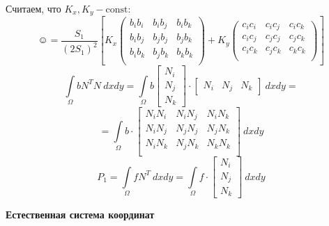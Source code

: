 \documentclass{bmstu}
\begin{document}
	
	Считаем, что $K_x, K_y - \text{const}$:
	\[
	\smiley = \dfrac{S_1}{(2S_1)^2} \left[K_x \begin{pmatrix}
		b_ib_i & b_ib_j & b_ib_k \\
		b_ib_j & b_jb_j & b_jb_k \\
		b_ib_k & b_jb_k & b_kb_k \\
	\end{pmatrix}+ K_y \begin{pmatrix}
	c_ic_i & c_ic_j & c_ic_k \\
	c_ic_j & c_jc_j & c_jc_k \\
	c_ic_k & c_jc_k & c_kc_k \\
	\end{pmatrix} \right] 
	\]
	\[
	\int\limits_{\Omega} b N^T N\ dx dy = \int\limits_{\Omega} b \begin{bmatrix}
		N_i \\ N_j \\ N_k
		\end{bmatrix}
		\cdot
		\begin{bmatrix}
		N_i & N_j & N_k
		\end{bmatrix}
		\ dx dy = 
	\]
	\[
	= \int\limits_{\Omega} b \cdot
	\begin{bmatrix}
	N_iN_i & N_iN_j & N_iN_k \\
	N_iN_j & N_jN_j & N_jN_k \\
	N_iN_k & N_jN_k & N_kN_k \\
	\end{bmatrix}
	\ dx dy
	\]
	\[
	P_1 = \int\limits_{\Omega} f N^T \ dx dy = \int\limits_{\Omega} f \cdot 
	\begin{bmatrix}
		N_i \\ N_j \\ N_k
		\end{bmatrix}
	\ dx dy
	\]
	\newpage
	\begin{center}
		\textbf{Естественная система координат}
	\end{center}
\end{document}
